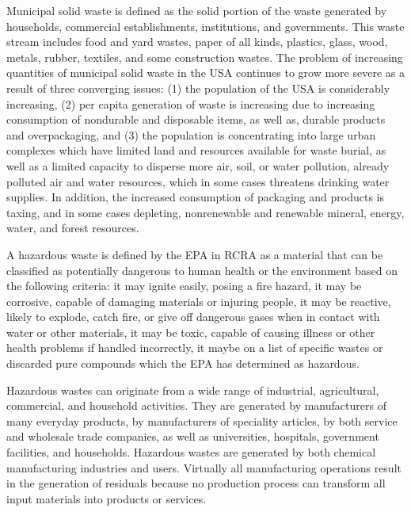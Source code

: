 \documentclass[11pt,a4paper]{article}
\begin{document}
\begin{enumerate}[leftmargin=*,topsep=0pt,font=\bfseries]
        Municipal solid waste is defined as the solid portion of the waste generated by households, commercial establishments, institutions, and governments. This waste stream includes food and yard wastes, paper of all kinds, plastics, glass, wood, metals, rubber, textiles, and some construction wastes. The problem of increasing quantities of municipal solid waste in the USA continues to grow more severe as a result of three converging issues: (1) the population of the USA is considerably increasing, (2) per capita generation of waste is increasing due to increasing consumption of nondurable and disposable items, as well as, durable products and overpackaging, and (3) the population is concentrating into large urban complexes which have limited land and resources available for waste burial, as well as a limited capacity to disperse more air, soil, or water pollution, already polluted air and water resources, which in some cases threatens drinking water supplies. In addition, the increased consumption of packaging and products is taxing, and in some cases depleting, nonrenewable and renewable mineral, energy, water, and forest resources.  

        A hazardous waste is defined by the EPA in RCRA as a material that can be classified as potentially dangerous to human health or the environment based on the following criteria: it may ignite easily, posing a fire hazard, it may be corrosive, capable of damaging materials or injuring people, it may be reactive, likely to explode, catch fire, or give off dangerous gases when in contact with water or other materials, it may be toxic, capable of causing illness or other health problems if handled incorrectly, it maybe on a list of specific wastes or discarded pure compounds which the EPA has determined as hazardous.

        Hazardous wastes can originate from a wide range of industrial, agricultural, commercial, and household activities. They are generated by manufacturers of many everyday products, by manufacturers of speciality articles, by both service and wholesale trade companies, as well as universities, hospitals, government facilities, and households. Hazardous wastes are generated by both chemical manufacturing industries and users. Virtually all manufacturing operations result in the generation of residuals because no production process can transform all input materials into products or services.
        \vspace{\baselineskip}
        
        
        

\end{enumerate}
\end{document}
